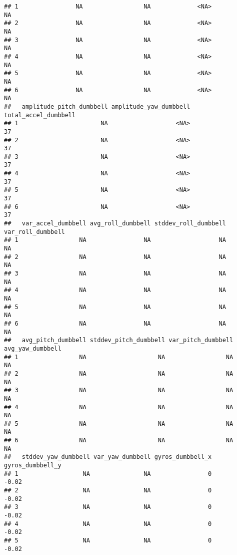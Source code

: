 \documentclass[
]{article}
\begin{document}
\begin{verbatim}
## 1                NA                 NA             <NA>                      NA
## 2                NA                 NA             <NA>                      NA
## 3                NA                 NA             <NA>                      NA
## 4                NA                 NA             <NA>                      NA
## 5                NA                 NA             <NA>                      NA
## 6                NA                 NA             <NA>                      NA
##   amplitude_pitch_dumbbell amplitude_yaw_dumbbell total_accel_dumbbell
## 1                       NA                   <NA>                   37
## 2                       NA                   <NA>                   37
## 3                       NA                   <NA>                   37
## 4                       NA                   <NA>                   37
## 5                       NA                   <NA>                   37
## 6                       NA                   <NA>                   37
##   var_accel_dumbbell avg_roll_dumbbell stddev_roll_dumbbell var_roll_dumbbell
## 1                 NA                NA                   NA                NA
## 2                 NA                NA                   NA                NA
## 3                 NA                NA                   NA                NA
## 4                 NA                NA                   NA                NA
## 5                 NA                NA                   NA                NA
## 6                 NA                NA                   NA                NA
##   avg_pitch_dumbbell stddev_pitch_dumbbell var_pitch_dumbbell avg_yaw_dumbbell
## 1                 NA                    NA                 NA               NA
## 2                 NA                    NA                 NA               NA
## 3                 NA                    NA                 NA               NA
## 4                 NA                    NA                 NA               NA
## 5                 NA                    NA                 NA               NA
## 6                 NA                    NA                 NA               NA
##   stddev_yaw_dumbbell var_yaw_dumbbell gyros_dumbbell_x gyros_dumbbell_y
## 1                  NA               NA                0            -0.02
## 2                  NA               NA                0            -0.02
## 3                  NA               NA                0            -0.02
## 4                  NA               NA                0            -0.02
## 5                  NA               NA                0            -0.02

\end{verbatim}
\end{document}
